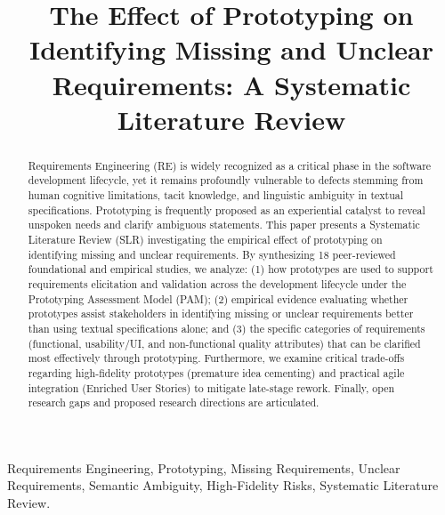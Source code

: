 \documentclass[conference]{IEEEtran}
\begin{document}
\title{The Effect of Prototyping on Identifying Missing and Unclear Requirements: A Systematic Literature Review}

\author{
}

\maketitle

\begin{abstract}
Requirements Engineering (RE) is widely recognized as a critical phase in the software development lifecycle, yet it remains profoundly vulnerable to defects stemming from human cognitive limitations, tacit knowledge, and linguistic ambiguity in textual specifications. Prototyping is frequently proposed as an experiential catalyst to reveal unspoken needs and clarify ambiguous statements. This paper presents a Systematic Literature Review (SLR) investigating the empirical effect of prototyping on identifying missing and unclear requirements. By synthesizing 18 peer-reviewed foundational and empirical studies, we analyze: (1) how prototypes are used to support requirements elicitation and validation across the development lifecycle under the Prototyping Assessment Model (PAM); (2) empirical evidence evaluating whether prototypes assist stakeholders in identifying missing or unclear requirements better than using textual specifications alone; and (3) the specific categories of requirements (functional, usability/UI, and non-functional quality attributes) that can be clarified most effectively through prototyping. Furthermore, we examine critical trade-offs regarding high-fidelity prototypes (premature idea cementing) and practical agile integration (Enriched User Stories) to mitigate late-stage rework. Finally, open research gaps and proposed research directions are articulated.
\end{abstract}

\begin{IEEEkeywords}
Requirements Engineering, Prototyping, Missing Requirements, Unclear Requirements, Semantic Ambiguity, High-Fidelity Risks, Systematic Literature Review.
\end{IEEEkeywords}


\end{document}
